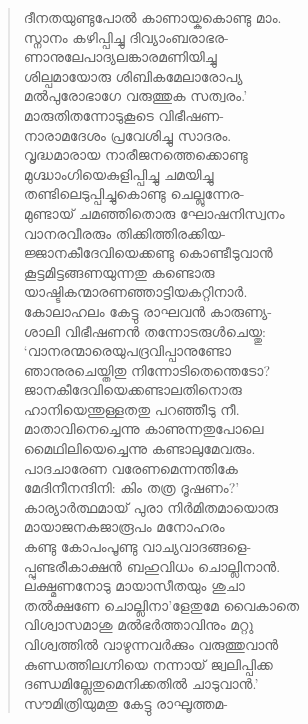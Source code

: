 \begin{verse}
ദീനതയുണ്ടുപോല്‍ കാണായ്കകൊണ്ടു മാം.\\
സ്നാനം കഴിപ്പിച്ചു ദിവ്യാംബരാഭര-\\
ണാനുലേപാദ്യലങ്കാരമണിയിച്ചു\\
ശില്പമായോരു ശിബികമേലാരോപ്യ\\
മല്‍പുരോഭാഗേ വരുത്തുക സത്വരം.’\\
മാരുതിതന്നോടുകൂടെ വിഭീഷണ-\\
നാരാമദേശം പ്രവേശിച്ചു സാദരം.\\
വൃദ്ധമാരായ നാരീജനത്തെക്കൊണ്ടു\\
മുഗ്ദ്ധാംഗിയെകുളിപ്പിച്ചു ചമയിച്ചു\\
തണ്ടിലെടുപ്പിച്ചുകൊണ്ടു ചെല്ലുന്നേര-\\
മുണ്ടായ് ചമഞ്ഞിതൊരു ഘോഷനിസ്വനം\\
വാനരവീരരും തിക്കിത്തിരക്കിയ-\\
ജ്ജാനകീദേവിയെക്കണ്ടു കൊണ്ടീടുവാന്‍\\
കൂട്ടമിട്ടങ്ങണയുന്നതു കണ്ടൊരു\\
യാഷ്ടികന്മാരണഞ്ഞാട്ടിയകറ്റിനാര്‍.\\
കോലാഹലം കേട്ടു രാഘവന്‍ കാരുണ്യ-\\
ശാലി വിഭീഷണന്‍ തന്നോടരുള്‍ചെയ്തു:\\
‘വാനരന്മാരെയുപദ്രവിപ്പാനുണ്ടോ\\
ഞാനുരചെയ്തിതു നിന്നോടിതെന്തെടോ?\\
ജാനകീദേവിയെക്കണ്ടാലതിനൊരു\\
ഹാനിയെന്തുള്ളതതു പറഞ്ഞീടു നീ.\\
മാതാവിനെച്ചെന്നു കാണുന്നതുപോലെ\\
മൈഥിലിയെച്ചെന്നു കണ്ടാലുമേവരും.\\
പാദചാരേണ വരേണമെന്നന്തികേ\\
മേദിനീനന്ദിനി: കിം തത്ര ദൂഷണം?’\\
കാര്യാര്‍ത്ഥമായ് പുരാ നിര്‍മിതമായൊരു\\
മായാജനകജാരൂപം മനോഹരം\\
കണ്ടു കോപംപൂണ്ടു വാച്യവാദങ്ങളെ-\\
പ്പുണ്ടരീകാക്ഷന്‍ ബഹുവിധം ചൊല്ലിനാന്‍.\\
ലക്ഷ്മണനോടു മായാസീതയും ശുചാ\\
തല്‍ക്ഷണേ ചൊല്ലിനാ’ളേതുമേ വൈകാതെ\\
വിശ്വാസമാശു മല്‍ഭര്‍ത്താവിനും മറ്റു\\
വിശ്വത്തില്‍ വാഴുന്നവര്‍ക്കും വരുത്തുവാന്‍\\
കുണ്ഡത്തിലഗ്നിയെ നന്നായ് ജ്വലിപ്പിക്ക\\
ദണ്ഡമില്ലേതുമെനിക്കതില്‍ ചാടുവാന്‍.’\\
സൗമിത്രിയുമതു കേട്ടു രാഘൂത്തമ-\\

\end{verse}
